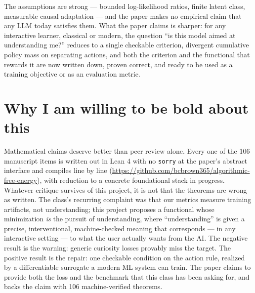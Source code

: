 \documentclass[11pt]{article}
\begin{document}
The assumptions are strong --- bounded log-likelihood ratios, finite latent class, measurable causal adaptation --- and the paper makes no empirical claim that any LLM today satisfies them. What the paper claims is sharper: for any interactive learner, classical or modern, the question ``is this model aimed at understanding me?'' reduces to a single checkable criterion, divergent cumulative policy mass on separating actions, and both the criterion and the functional that rewards it are now written down, proven correct, and ready to be used as a training objective or as an evaluation metric.

\section*{Why I am willing to be bold about this}

Mathematical claims deserve better than peer review alone. Every one of the 106 manuscript items is written out in Lean 4 with no \texttt{sorry} at the paper's abstract interface and compiles line by line (\url{https://github.com/bcbrown365/algorithmic-free-energy}), with reduction to a concrete foundational stack in progress. Whatever critique survives of this project, it is not that the theorems are wrong as written. The class's recurring complaint was that our metrics measure training artifacts, not understanding; this project proposes a functional whose minimization \emph{is} the pursuit of understanding, where ``understanding'' is given a precise, interventional, machine-checked meaning that corresponds --- in any interactive setting --- to what the user actually wants from the AI. The negative result is the warning: generic curiosity losses provably miss the target. The positive result is the repair: one checkable condition on the action rule, realized by a differentiable surrogate a modern ML system can train. The paper claims to provide both the loss and the benchmark that this class has been asking for, and backs the claim with 106 machine-verified theorems.
\end{document}
